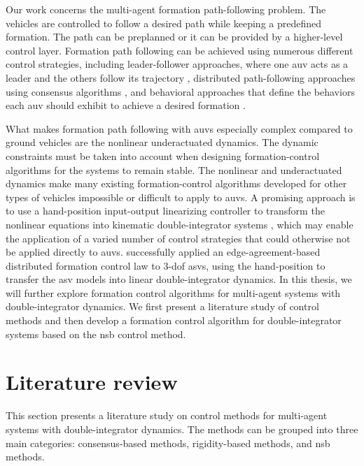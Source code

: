 Our work concerns the multi-agent formation path-following problem. The vehicles are controlled to follow a desired path while keeping a predefined formation. The path can be preplanned or it can be provided by a higher-level control layer. Formation path following can be achieved using numerous different control strategies, including leader-follower approaches, where one \gls{auv} acts as a leader and the others follow its trajectory \citep{soorki_robust_2011, cui_leaderfollower_2010, wang_leader-follower_2009}, distributed path-following approaches using consensus algorithms \citep{skjetne_nonlinear_2002,ghabcheloo_coordinated_2006, borhaug_formation_2006}, and behavioral approaches that define the behaviors each \gls{auv} should exhibit to achieve a desired formation \citep{monteiro_dynamical_2002, balch_behavior-based_1998}.

What makes formation path following with \glspl{auv} especially complex compared to ground vehicles are the nonlinear underactuated dynamics. The dynamic constraints must be taken into account when designing formation-control algorithms for the systems to remain stable. The nonlinear and underactuated dynamics make many existing formation-control algorithms developed for other types of vehicles impossible or difficult to apply to \glspl{auv}. A promising approach is to use a hand-position input-output linearizing controller to transform the nonlinear equations into kinematic double-integrator systems \citep{matous_trajectory_2023, paliotta_trajectory_2019}, which may enable the application of a varied number of control strategies that could otherwise not be applied directly to \glspl{auv}. \cite{restrepo_tracking--formation_2022} successfully applied an edge-agreement-based distributed formation control law to 3-\gls{dof} \glspl{asv}, using the hand-position to transfer the \gls{asv} models into linear double-integrator dynamics. In this thesis, we will further explore formation control algorithms for multi-agent systems with double-integrator dynamics. We first present a literature study of control methods and then develop a formation control algorithm for double-integrator systems based on the \gls{nsb} control method.

\vspace*{-3mm}
\section{Literature review}\label{sec:literature_review}
This section presents a literature study on control methods for multi-agent systems with double-integrator dynamics. The methods can be grouped into three main categories: consensus-based methods, rigidity-based methods, and \gls{nsb} methods.

